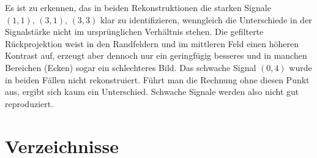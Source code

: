 \documentclass[slug=PET, room=Andreas-Schubert-Bau\,\ 424A, supervisor=Carsten\ Bittrich, coursedate=10.\ 01.\ 2020]{../../Lab_Report_LaTeX/lab_report}
\begin{document}
Es ist zu erkennen, das in beiden Rekonstruktionen die starken Signale
\((1,1),\,(3,1),\,(3,3)\) klar zu identifizieren, wenngleich die
Unterschiede in der Signalst\"arke nicht im urspr\"unglichen
Verh\"altnis stehen. Die gefilterte R\"uckprojektion weist in den
Randfeldern und im mittleren Feld einen h\"oheren Kontrast auf,
erzeugt aber dennoch nur ein geringf\"ugig besseres und in manchen
Bereichen (Ecken) sogar ein schlechteres Bild. Das schwache Signal
\((0,4)\) wurde in beiden F\"allen nicht rekonstruiert. F\"uhrt man
die Rechnung ohne diesen Punkt aus, ergibt sich kaum ein
Unterschied. Schwache Signale werden also nicht gut reproduziert.

\newpage
\section{Verzeichnisse}
\label{sec:literatur}

\listoffigures

\listoftables

\printbibliography
\end{document}
